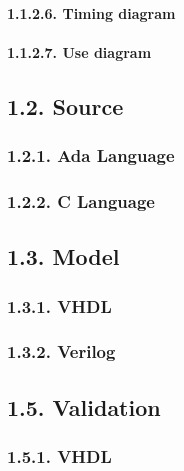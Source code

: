 \documentclass[
]{article}
\begin{document}
\hypertarget{timing-diagram}{%
\paragraph{1.1.2.6. Timing diagram}\label{timing-diagram}}

\hypertarget{use-diagram}{%
\paragraph{1.1.2.7. Use diagram}\label{use-diagram}}

\hypertarget{source}{%
\subsection{1.2. Source}\label{source}}

\hypertarget{ada-language}{%
\subsubsection{1.2.1. Ada Language}\label{ada-language}}

\hypertarget{c-language}{%
\subsubsection{1.2.2. C Language}\label{c-language}}

\hypertarget{model}{%
\subsection{1.3. Model}\label{model}}

\hypertarget{vhdl}{%
\subsubsection{1.3.1. VHDL}\label{vhdl}}

\hypertarget{verilog}{%
\subsubsection{1.3.2. Verilog}\label{verilog}}

\hypertarget{validation}{%
\subsection{1.5. Validation}\label{validation}}

\hypertarget{vhdl-1}{%
\subsubsection{1.5.1. VHDL}\label{vhdl-1}}
\end{document}

